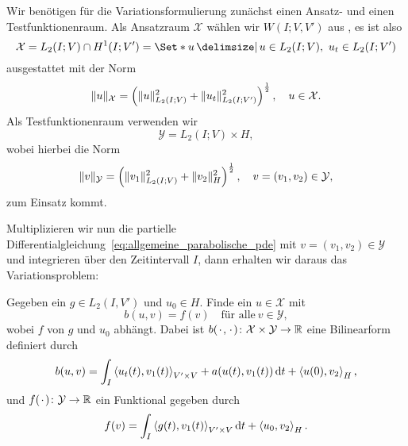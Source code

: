 Wir benötigen für die Variationsformulierung zunächst einen Ansatz- und einen Testfunktionenraum.
Als Ansatzraum $\mathcal X$ wählen wir $W(I; V, V')$ aus , es ist also
\begin{equation}
    \label{eq:var_all_ansatzraum_x}
    \mathcal X = L_{2}(I; V) \cap H^{1}(I; V') = \Set*{ u \given u \in L_{2}(I; V),~u_{t} \in L_{2}(I; V') }
\end{equation}
ausgestattet mit der Norm
\begin{equation}
    \label{eq:var_all_ansatzraum_x_norm}
    \lVert u\rVert_{\mathcal X} = \left( \lVert u\rVert_{L_{2}{(I; V)}}^{2} + \lVert u_{t}\rVert_{L_{2}{(I; V')}}^{2} \right)^{\frac 12}, \quad u \in \mathcal X.
\end{equation}
Als Testfunktionenraum verwenden wir
\begin{equation}
    \label{eq:var_all_testraum_y}
    \mathcal Y = L_{2}(I; V) \times H,
\end{equation}
wobei hierbei die Norm
\begin{equation}
    \label{eq:var_all_testraum_y_norm}
    \lVert v\rVert_{\mathcal Y} = \left( \lVert v_{1}\rVert_{L_{2}(I; V)}^{2} + \lVert v_{2}\rVert_{H}^{2} \right)^{\frac 12}, \quad v = (v_{1}, v_{2}) \in \mathcal Y,
\end{equation}
zum Einsatz kommt.

Multiplizieren wir nun die partielle Differentialgleichung~\eqref{eq:allgemeine_parabolische_pde} mit $v = (v_{1}, v_{2}) \in \mathcal Y$ und integrieren über den Zeitintervall $I$, dann erhalten wir daraus das Variationsproblem:

Gegeben ein $g \in L_{2}(I, V')$ und $u_{0} \in H$. Finde ein $u \in \mathcal X$ mit
\begin{equation}
    \label{eq:var_all_problem}
    b(u, v) = f(v) \quad \text{für alle}~v \in \mathcal Y,
\end{equation}
wobei $f$ von $g$ und $u_{0}$ abhängt.
Dabei ist $b({\mkern2mu\cdot\mkern2mu}, {\mkern2mu\cdot\mkern2mu}) \colon \mathcal X \times \mathcal Y \to \mathbb{R}$ eine Bilinearform definiert durch
\begin{equation}
    \label{eq:var_all_bf_b}
    b(u, v) = \int_{I} \left\langle u_{t}(t),v_{1}(t)\right\rangle_{V' \times V} + a(u(t), v_{1}(t)) \mathop{}\!\mathrm{d} t + \left\langle u(0),v_{2}\right\rangle_{H},
\end{equation}
und $f({\mkern2mu\cdot\mkern2mu}) \colon \mathcal Y \to \mathbb{R}$ ein Funktional gegeben durch
\begin{equation}
    \label{eq:var_all_f}
    f(v) = \int_{I} \left\langle g(t),v_{1}(t)\right\rangle_{V' \times V} \mathop{}\!\mathrm{d} t + \left\langle u_{0},v_{2}\right\rangle_{H}.
\end{equation}


